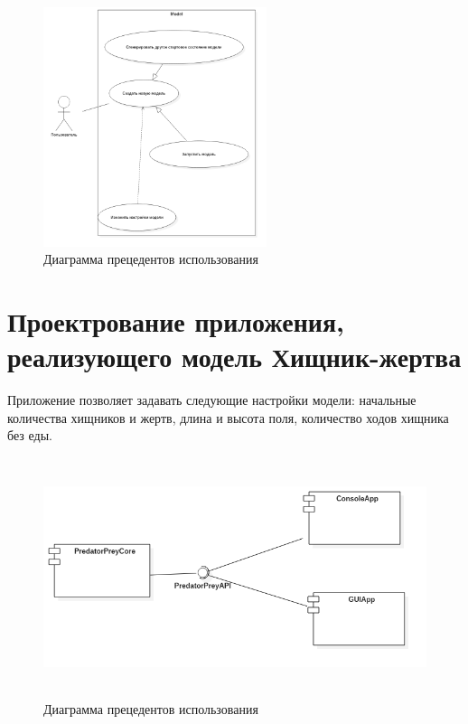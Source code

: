 \documentclass[a4paper]{article}
\begin{document}
\begin{figure}[H]
	\begin{center}
		\includegraphics[scale=0.4, height=7cm]{pictures/UseCaseDiagram1}
		\caption{Диаграмма прецедентов использования} 
		\label{pic:UseCaseDiagram1} %
	\end{center}
\end{figure}

\section{Проектрование приложения, реализующего модель Хищник-жертва}
Приложение позволяет задавать следующие настройки модели: начальные количества хищников и жертв, длина и высота поля, количество ходов хищника без еды. 

\begin{figure}[H]
	\begin{center}
		\includegraphics[scale=0.4, height=7cm]{pictures/ComponentDiagram1}
		\caption{Диаграмма прецедентов использования} 
		\label{pic:ComponentDiagram} %
	\end{center}
\end{figure}
\end{document}
